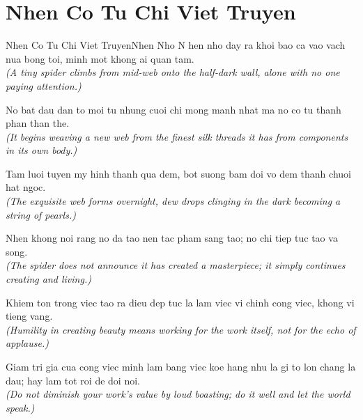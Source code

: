 \section{Nhen Co Tu Chi Viet Truyen}
\begin{truyen}{Nhen Co Tu Chi Viet Truyen}{Nhen Nho}
N hen nho day ra khoi bao ca vao vach nua bong toi, minh mot khong ai quan tam.\\
\textit{(A tiny spider climbs from mid-web onto the half-dark wall, alone with no one paying attention.)}

No bat dau dan to moi tu nhung cuoi chi mong manh nhat ma no co tu thanh phan than the.\\
\textit{(It begins weaving a new web from the finest silk threads it has from components in its own body.)}

Tam luoi tuyen my hinh thanh qua dem, bot suong bam doi vo dem thanh chuoi hat ngoc.\\
\textit{(The exquisite web forms overnight, dew drops clinging in the dark becoming a string of pearls.)}

Nhen khong noi rang no da tao nen tac pham sang tao; no chi tiep tuc tao va song.\\
\textit{(The spider does not announce it has created a masterpiece; it simply continues creating and living.)}

Khiem ton trong viec tao ra dieu dep tuc la lam viec vi chinh cong viec, khong vi tieng vang.\\
\textit{(Humility in creating beauty means working for the work itself, not for the echo of applause.)}

\end{truyen}
\begin{baihoc}
  Giam tri gia cua cong viec minh lam bang viec koe hang nhu la gi to lon chang la dau; hay lam tot roi de doi noi.\\
  \textit{(Do not diminish your work's value by loud boasting; do it well and let the world speak.)}
\end{baihoc}

